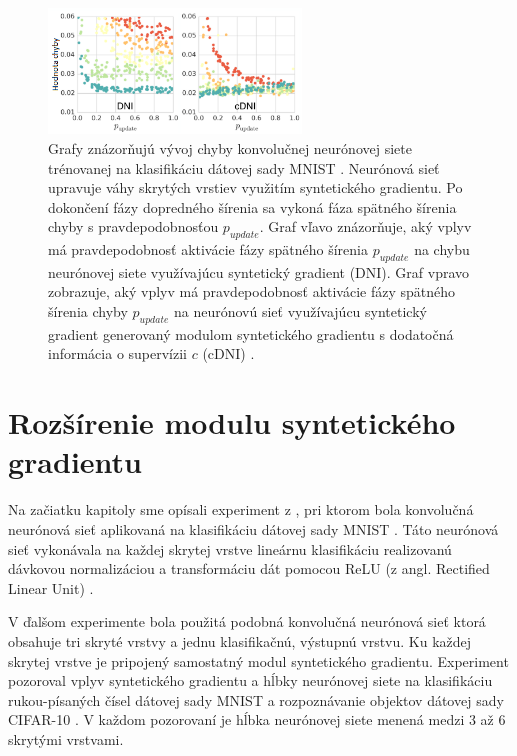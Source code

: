 \begin{figure}
\centerline{\includegraphics[width=0.6\textwidth]{images/vysledkyExperimentuBpLambda}}
\caption[Podmienenie aktivácie spätného šírenia chyby pravdepodobnosťou $p\textsubscript{update}$]{Grafy znázorňujú vývoj chyby konvolučnej neurónovej siete trénovanej na klasifikáciu dátovej sady MNIST \cite{yann1998mnist}. Neurónová sieť upravuje váhy skrytých vrstiev využitím syntetického gradientu. Po dokončení fázy dopredného šírenia sa vykoná fáza spätného šírenia chyby s pravdepodobnosťou $p_{update}$. Graf vľavo znázorňuje, aký vplyv má pravdepodobnosť aktivácie fázy spätného šírenia $p_{update}$ na chybu neurónovej siete využívajúcu syntetický gradient (DNI). Graf vpravo zobrazuje, aký vplyv má pravdepodobnosť aktivácie fázy spätného šírenia chyby $p_{update}$ na neurónovú sieť využívajúcu syntetický gradient generovaný modulom syntetického gradientu s dodatočná informácia o supervízii $c$ (cDNI) \cite{Jaderberg2016}.}
\label{vysledkyExperimentuBpLambda}
\end{figure}

\section{Rozšírenie modulu syntetického gradientu}
\label{experiment_SG2}

Na začiatku kapitoly sme opísali experiment z \cite{Jaderberg2016}, pri ktorom bola konvolučná neurónová sieť aplikovaná na klasifikáciu dátovej sady MNIST \cite{yann1998mnist}. Táto neurónová sieť vykonávala na každej skrytej vrstve lineárnu klasifikáciu realizovanú dávkovou normalizáciou \cite{Ioffe2015} a transformáciu dát pomocou ReLU (z angl. Rectified Linear Unit) \cite{Xu2015}. 

V ďalšom experimente \cite{Jaderberg2016} bola použitá podobná konvolučná neurónová sieť ktorá obsahuje tri skryté vrstvy a jednu klasifikačnú, výstupnú vrstvu. Ku každej skrytej vrstve je pripojený samostatný modul syntetického gradientu. Experiment pozoroval vplyv syntetického gradientu a hĺbky neurónovej siete na klasifikáciu rukou-písaných čísel dátovej sady MNIST a rozpoznávanie objektov dátovej sady CIFAR-10 \cite{Krizhevsky09learningmultiple}. V každom pozorovaní je hĺbka neurónovej siete menená medzi 3 až 6 skrytými vrstvami. 

